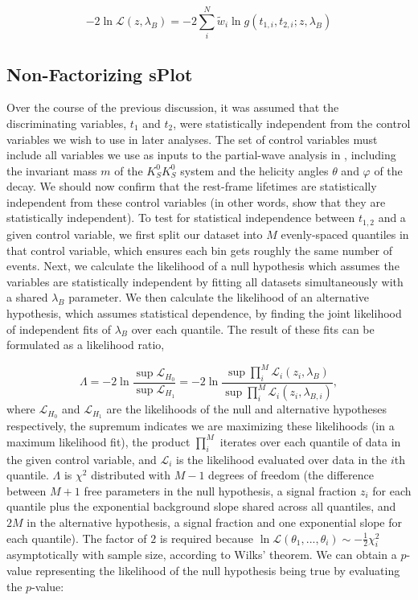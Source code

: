 \begin{equation}
  -2\ln\mathcal{L}(z,  \lambda_B) = -2\sum_i^N \tilde{w}_i \ln g(t_{1,i}, t_{2,i}; z, \lambda_B)
  \label{eq:splot-nll}
\end{equation}

\subsection{Non-Factorizing sPlot}\label{sec:non-factorizing-splot}

Over the course of the previous discussion, it was assumed that the discriminating variables, $t_1$ and $t_2$, were statistically independent from the control variables we wish to use in later analyses. The set of control variables must include all variables we use as inputs to the partial-wave analysis in , including the invariant mass $m$ of the $K_S^0K_S^0$ system and the helicity angles $\theta$ and $\varphi$ of the decay. We should now confirm that the rest-frame lifetimes are statistically independent from these control variables (in other words, show that they are statistically independent). To test for statistical independence between $t_{1,2}$ and a given control variable, we first split our dataset into $M$ evenly-spaced quantiles in that control variable, which ensures each bin gets roughly the same number of events. Next, we calculate the likelihood of a null hypothesis which assumes the variables are statistically independent by fitting all datasets simultaneously with a shared $\lambda_B$ parameter. We then calculate the likelihood of an alternative hypothesis, which assumes statistical dependence, by finding the joint likelihood of independent fits of $\lambda_B$ over each quantile. The result of these fits can be formulated as a likelihood ratio,

\begin{equation}
  \Lambda = -2\ln\frac{\sup \mathcal{L}_{H_0}}{\sup \mathcal{L}_{H_1}} = -2\ln\frac{\sup \prod_i^M \mathcal{L}_i(z_i, \lambda_B)}{\sup \prod_i^M \mathcal{L}_i(z_i, \lambda_{B,i})},
  \label{eq:independence-test}
\end{equation}
where $\mathcal{L}_{H_0}$ and $\mathcal{L}_{H_1}$ are the likelihoods of the null and alternative hypotheses respectively, the supremum indicates we are maximizing these likelihoods (in a maximum likelihood fit), the product $\prod_i^M$ iterates over each quantile of data in the given control variable, and $\mathcal{L}_i$ is the likelihood evaluated over data in the $i$th quantile. $\Lambda$ is $\chi^2$ distributed with $M - 1$ degrees of freedom (the difference between $M + 1$ free parameters in the null hypothesis, a signal fraction $z_i$ for each quantile plus the exponential background slope shared across all quantiles, and $2M$ in the alternative hypothesis, a signal fraction and one exponential slope for each quantile). The factor of $2$ is required because $\ln\mathcal{L}(\theta_1,...,\theta_i) \sim -\frac{1}{2}\chi^2_i$ asymptotically with sample size, according to Wilks' theorem. We can obtain a $p$-value representing the likelihood of the null hypothesis being true by evaluating the $p$-value:

